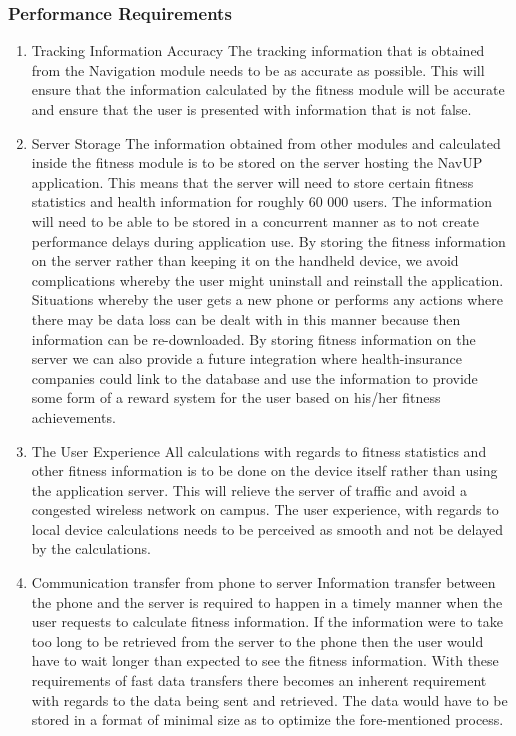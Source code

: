 \subsubsection{Performance Requirements}
\begin{enumerate}
	\item Tracking Information Accuracy
	\newline
	The tracking information that is obtained from the Navigation module needs to be as accurate as possible. This will ensure that the information calculated by the fitness module will be accurate and ensure that the user is presented with information that is not false.
	\item Server Storage
	\newline
	The information obtained from other modules and calculated inside the fitness module is to be stored on the server hosting the NavUP application. This means that the server will need to store certain fitness statistics and health information for roughly 60 000 users. The information will need to be able to be stored in a concurrent manner as to not create performance delays during application use.
	\newline
	By storing the fitness information on the server rather than keeping it on the handheld device, we avoid complications whereby the user might uninstall and reinstall the application. Situations whereby the user gets a new phone or performs any actions where there may be data loss can be dealt with in this manner because then information can be re-downloaded.  
	\newline
By storing fitness information on the server we can also provide a future integration where health-insurance companies could link to the database and use the information to provide some form of a reward system for the user based on his/her fitness achievements.  

\item The User Experience 
	\newline
All calculations with regards to fitness statistics and other fitness information is to be done on the device itself rather than using the application server. This will relieve the server of traffic and avoid a congested wireless network on campus. The user experience, with regards to local device calculations needs to be perceived as smooth and not be delayed by the calculations.

\item Communication transfer from phone to server
	\newline
Information transfer between the phone and the server is required to happen in a timely manner when the user requests to calculate fitness information. If the information were to take too long to be retrieved from the server to the phone then the user would have to wait longer than expected to see the fitness information.
	\newline
With these requirements of fast data transfers there becomes an inherent requirement with regards to the data being sent and retrieved. The data would have to be stored in a format of minimal size as to optimize the fore-mentioned process.



\end{enumerate}
